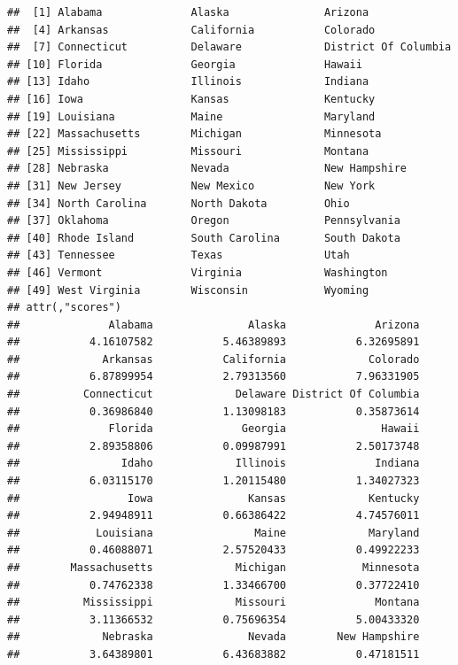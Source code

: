 \documentclass[
]{article}
\begin{document}
\begin{verbatim}
##  [1] Alabama              Alaska               Arizona             
##  [4] Arkansas             California           Colorado            
##  [7] Connecticut          Delaware             District Of Columbia
## [10] Florida              Georgia              Hawaii              
## [13] Idaho                Illinois             Indiana             
## [16] Iowa                 Kansas               Kentucky            
## [19] Louisiana            Maine                Maryland            
## [22] Massachusetts        Michigan             Minnesota           
## [25] Mississippi          Missouri             Montana             
## [28] Nebraska             Nevada               New Hampshire       
## [31] New Jersey           New Mexico           New York            
## [34] North Carolina       North Dakota         Ohio                
## [37] Oklahoma             Oregon               Pennsylvania        
## [40] Rhode Island         South Carolina       South Dakota        
## [43] Tennessee            Texas                Utah                
## [46] Vermont              Virginia             Washington          
## [49] West Virginia        Wisconsin            Wyoming             
## attr(,"scores")
##              Alabama               Alaska              Arizona 
##           4.16107582           5.46389893           6.32695891 
##             Arkansas           California             Colorado 
##           6.87899954           2.79313560           7.96331905 
##          Connecticut             Delaware District Of Columbia 
##           0.36986840           1.13098183           0.35873614 
##              Florida              Georgia               Hawaii 
##           2.89358806           0.09987991           2.50173748 
##                Idaho             Illinois              Indiana 
##           6.03115170           1.20115480           1.34027323 
##                 Iowa               Kansas             Kentucky 
##           2.94948911           0.66386422           4.74576011 
##            Louisiana                Maine             Maryland 
##           0.46088071           2.57520433           0.49922233 
##        Massachusetts             Michigan            Minnesota 
##           0.74762338           1.33466700           0.37722410 
##          Mississippi             Missouri              Montana 
##           3.11366532           0.75696354           5.00433320 
##             Nebraska               Nevada        New Hampshire 
##           3.64389801           6.43683882           0.47181511 

\end{verbatim}
\end{document}
